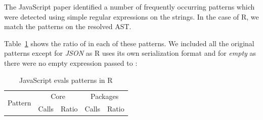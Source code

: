 \documentclass[conference]{IEEEtran}
\begin{document}
The JavaScript paper identified a number of frequently occurring \eval patterns
which were detected using simple regular expressions on the \eval strings. In
the case of R, we match the patterns on the resolved AST.

Table~\ref{table:js-pattens-in-r} shows the ratio of \eval in each of these
patterns. We included all the original patterns except for \emph{JSON} as R uses
its own serialization format and for \emph{empty} as there were no empty expression
passed to \eval:

\begin{table}[ht]%
  \centering
\begin{tabular}{r|r|r|r|r}\hline
\multirow{2}{*}{Pattern} & \multicolumn{2}{c|}{Core} & \multicolumn{2}{c}{Packages} \\
                         & Calls & Ratio            & Calls & Ratio \\\hline

\end{tabular}
\caption{JavaScript evals patterns in R}
\label{table:js-pattens-in-r}
\end{table}

\end{document}
